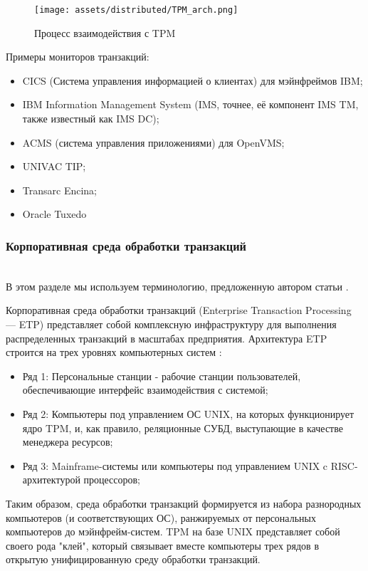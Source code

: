 \begin{figure}[h!]
    \centering
    \texttt{[image: assets/distributed/TPM\_arch.png]}
    \caption{Процесс взаимодействия с TPM}
    \label{tpm_process}
\end{figure}

Примеры мониторов транзакций:
\begin{itemize}
  \item CICS (Система управления информацией о клиентах) для мэйнфреймов IBM;
  \item IBM Information Management System (IMS, точнее, её компонент IMS TM, также известный как IMS DC);
  \item ACMS (система управления приложениями) для OpenVMS;
  \item UNIVAC TIP;
  \item Transarc Encina;
  \item Oracle Tuxedo
\end{itemize}


\subsubsection{Корпоративная среда обработки транзакций}~\\

В этом разделе мы используем терминологию, предложенную автором статьи \autocite{TransactionMonitors}.

Корпоративная среда обработки транзакций  (Enterprise Transaction Processing — ETP) представляет собой комплексную инфраструктуру для выполнения распределенных транзакций в масштабах 
предприятия. Архитектура ETP строится на трех уровнях компьютерных систем \autocite{TransactionMonitors}:

\begin{itemize}
    \item Ряд 1: Персональные станции - рабочие станции пользователей, обеспечивающие интерфейс взаимодействия с системой;
    \item Ряд 2: Компьютеры под управлением ОС UNIX, на которых функционирует ядро TPM, и, как правило, реляционные СУБД, выступающие в качестве менеджера ресурсов;
    \item Ряд 3: Mainframe-системы или компьютеры под управлением UNIX c RISC-архитектурой процессоров;
\end{itemize}

Таким образом, среда обработки транзакций формируется из набора разнородных компьютеров (и соответствующих ОС),
ранжируемых от персональных компьютеров до мэйнфрейм-систем. TPM на базе UNIX представляет собой своего
рода "клей", который связывает вместе компьютеры трех рядов в открытую унифицированную среду обработки транзакций.

